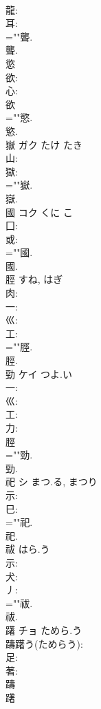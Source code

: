 \documentclass[8pt]{extreport}
\begin{document}
\begin{CJK}{UTF8}{min}
\\	龍: 
\\	耳: 
\\	=""聾.
\\	聾.
\\	慾						
\\	欲: 
\\	心: 
\\	欲 
\\	=""慾.
\\	慾.
\\	嶽	ガク	たけ	たき	
\\	山: 
\\	獄: 
\\	=""嶽.
\\	嶽.
\\	國	コク	くに	こ	
\\	囗: 
\\	或: 
\\	=""國.
\\	國.
\\	脛		すね, はぎ				
\\	肉: 
\\	一: 
\\	巛: 
\\	工: 
\\	=""脛.
\\	脛.
\\	勁	ケイ	つよ.い		
\\	一: 
\\	巛: 
\\	工: 
\\	力: 
\\	脛 
\\	=""勁.
\\	勁.
\\	祀	シ	まつ.る, まつり		
\\	示: 
\\	巳: 
\\	=""祀.
\\	祀.
\\	祓		はら.う				
\\	示: 
\\	犬: 
\\	丿: 
\\	=""祓.
\\	祓.
\\	躇	チョ	ためら.う		
\\	躊躇う(ためらう): 
\\	足: 
\\	著: 
\\	躊
\\	躇

\end{CJK}
\end{document}
